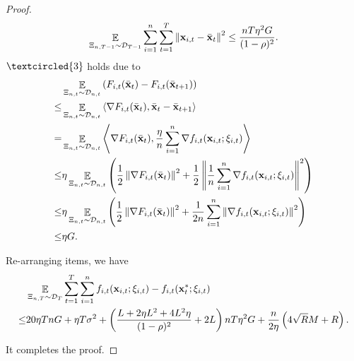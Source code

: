 \documentclass{article}
\begin{document}
\begin{proof}
\begin{align}
\nonumber
\mathop{\mathbb{E}}_{ \Xi_{n,T-1} \sim \mathcal{D}_{T-1} } \sum_{i=1}^n\sum_{t=1}^T \left\lVert{\bf x}_{i,t} - \bar{{\bf x}}_t\right\rVert^2 \le \frac{nT\eta^2 G }{(1-\rho)^2}.
\end{align} $\textcircled{3}$ holds due to 
\begin{align}
\nonumber
& \mathop{\mathbb{E}}_{ \Xi_{n,t} \sim \mathcal{D}_{n,t} } \left( F_{i,t}(\bar{{\bf x}}_t) - F_{i,t}(\bar{{\bf x}}_{t+1})  \right) \\ \nonumber 
\le & \mathop{\mathbb{E}}_{ \Xi_{n,t} \sim \mathcal{D}_{n,t} } \left\langle\nabla F_{i,t}(\bar{{\bf x}}_t), \bar{{\bf x}}_t - \bar{{\bf x}}_{t+1} \right\rangle \\ \nonumber
= & \mathop{\mathbb{E}}_{ \Xi_{n,t} \sim \mathcal{D}_{n,t} } \left\langle\nabla F_{i,t}(\bar{{\bf x}}_t), \frac{\eta}{n}\sum_{i=1}^n\nabla f_{i,t}({\bf x}_{i,t};\xi_{i,t})  \right\rangle \\ \nonumber
\le & \eta\mathop{\mathbb{E}}_{ \Xi_{n,t} \sim \mathcal{D}_{n,t} }\left(  \frac{1}{2}\left\lVert\nabla F_{i,t}(\bar{{\bf x}}_t)\right\rVert^2 + \frac{1}{2} \left\lVert\frac{1}{n}\sum_{i=1}^n\nabla f_{i,t}({\bf x}_{i,t};\xi_{i,t})\right\rVert^2  \right)\\ \nonumber
\le & \eta\mathop{\mathbb{E}}_{ \Xi_{n,t} \sim \mathcal{D}_{n,t} }\left(  \frac{1}{2}\left\lVert\nabla F_{i,t}(\bar{{\bf x}}_t)\right\rVert^2 + \frac{1}{2n}\sum_{i=1}^n\left\lVert\nabla f_{i,t}({\bf x}_{i,t};\xi_{i,t})\right\rVert^2  \right)\\ \nonumber
\le & \eta G. 
\end{align}

Re-arranging items, we have
\begin{align}
\nonumber
& \mathop{\mathbb{E}}_{ \Xi_{n,T} \sim \mathcal{D}_{T} } \sum_{t=1}^T\sum_{i=1}^n f_{i,t}({\bf x}_{i,t};\xi_{i,t}) - f_{i,t}({\bf x}_t^\ast;\xi_{i,t}) \\ \nonumber
\le & 20\eta T n G +  \eta T\sigma^2 + \left( \frac{L + 2\eta L^2  + 4L^2 \eta}{(1-\rho)^2} +2L \right)  nT\eta^2 G    + \frac{n}{2\eta}\left(  4\sqrt{R}M + R   \right).
\end{align}

It completes the proof.



\end{proof}
\end{document}
